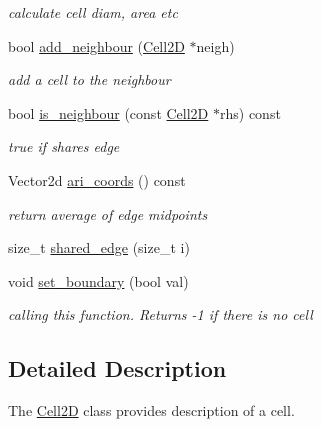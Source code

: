 \begin{DoxyCompactItemize}
\begin{DoxyCompactList}\small\item\em calculate cell diam, area etc \end{DoxyCompactList}\item 
\mbox{\label{classHArDCore2D_1_1Cell2D_a292fc40f47362fd33ba6eeea8181b444}} 
bool \hyperlink{classHArDCore2D_1_1Cell2D_a292fc40f47362fd33ba6eeea8181b444}{add\+\_\+neighbour} (\hyperlink{classHArDCore2D_1_1Cell2D}{Cell2D} $\ast$neigh)
\begin{DoxyCompactList}\small\item\em add a cell to the neighbour \end{DoxyCompactList}\item 
\mbox{\label{classHArDCore2D_1_1Cell2D_a557da6f9e39c77c05bb2d42108d1728d}} 
bool \hyperlink{classHArDCore2D_1_1Cell2D_a557da6f9e39c77c05bb2d42108d1728d}{is\+\_\+neighbour} (const \hyperlink{classHArDCore2D_1_1Cell2D}{Cell2D} $\ast$rhs) const
\begin{DoxyCompactList}\small\item\em true if shares edge \end{DoxyCompactList}\item 
\mbox{\label{classHArDCore2D_1_1Cell2D_adea88b0500005fa433bc4bb63b74a29b}} 
Vector2d \hyperlink{classHArDCore2D_1_1Cell2D_adea88b0500005fa433bc4bb63b74a29b}{ari\+\_\+coords} () const
\begin{DoxyCompactList}\small\item\em return average of edge midpoints \end{DoxyCompactList}\item 
size\+\_\+t \hyperlink{classHArDCore2D_1_1Cell2D_a7ec95ac9c1ef2551f6ca2a4b2078ee40}{shared\+\_\+edge} (size\+\_\+t i)
\item 
void \hyperlink{classHArDCore2D_1_1Cell2D_a05ea21ad89b3caec0d71ca543e3c7247}{set\+\_\+boundary} (bool val)
\begin{DoxyCompactList}\small\item\em calling this function. Returns -\/1 if there is no cell \end{DoxyCompactList}\end{DoxyCompactItemize}


\subsection{Detailed Description}
The \hyperlink{classHArDCore2D_1_1Cell2D}{Cell2D} class provides description of a cell. 

